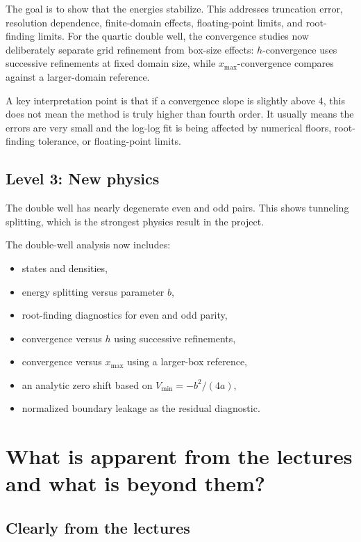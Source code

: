 \documentclass[11pt]{article}
\begin{document}
    The goal is to show that the energies stabilize. This addresses truncation error, resolution dependence, finite-domain effects, floating-point limits, and root-finding limits. For the quartic double well, the convergence studies now deliberately separate grid refinement from box-size effects: $h$-convergence uses successive refinements at fixed domain size, while $x_{\max}$-convergence compares against a larger-domain reference.

    A key interpretation point is that if a convergence slope is slightly above 4, this does not mean the method is truly higher than fourth order. It usually means the errors are very small and the log-log fit is being affected by numerical floors, root-finding tolerance, or floating-point limits.

    \subsection{Level 3: New physics}

    The double well has nearly degenerate even and odd pairs. This shows tunneling splitting, which is the strongest physics result in the project.

    The double-well analysis now includes:
    \begin{itemize}
        \item states and densities,
        \item energy splitting versus parameter $b$,
        \item root-finding diagnostics for even and odd parity,
        \item convergence versus $h$ using successive refinements,
        \item convergence versus $x_{\max}$ using a larger-box reference,
        \item an analytic zero shift based on $V_{\min}=-b^2/(4a)$,
        \item normalized boundary leakage as the residual diagnostic.
    \end{itemize}

    \section{What is apparent from the lectures and what is beyond them?}

    \subsection{Clearly from the lectures}
\end{document}
